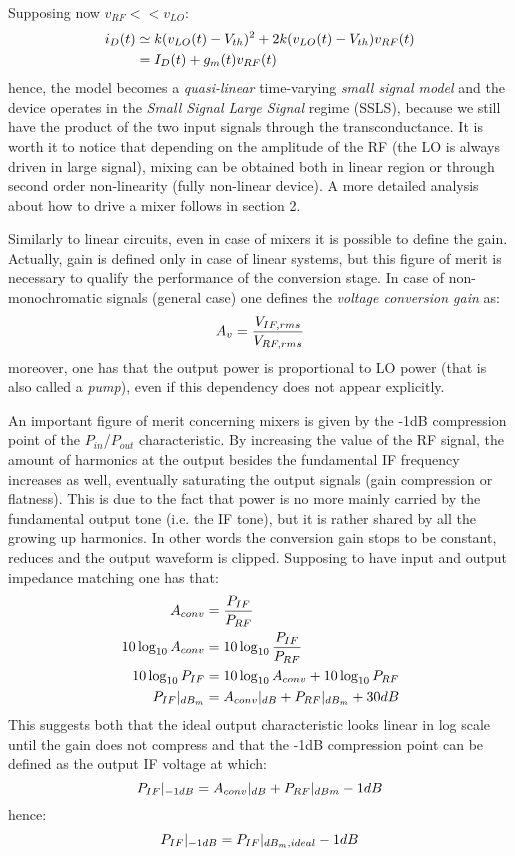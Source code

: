 Supposing now $v_{RF}<<v_{LO}$:
\begin{align}
i_D(t) &\simeq k(v_{LO}(t)-V_{th})^2+2k(v_{LO}(t)-V_{th})v_{RF}(t) \notag  \\
& = I_D(t)+g_m(t)v_{RF}(t) \notag
\end{align}
hence, the model becomes a \emph{quasi-linear} time-varying \emph{small signal model} and the device operates in the \emph{Small Signal Large Signal} regime (SSLS), because we still have the product of the two input signals through the transconductance. It is worth it to notice that depending on the amplitude of the RF (the LO is always driven in large signal), mixing can be obtained both in linear region or through second order non-linearity (fully non-linear device).
A more detailed analysis about how to drive a mixer follows in section 2.

Similarly to linear circuits, even in case of mixers it is possible to define the gain. Actually, gain is defined only in case of linear systems, but this figure of merit is necessary to qualify the performance of the conversion stage.
In case of non-monochromatic signals (general case) one defines the \emph{voltage conversion gain} as:
\begin{equation}
	A_v= \frac{V_{IF,rms}}{V_{RF,rms}} \notag
\end{equation}
moreover, one has that the output power is proportional to LO power (that is also called a \emph{pump}), even if this dependency does not appear explicitly.

An important figure of merit concerning mixers is given by the -1dB compression point of the $P_{in}$/$P_{out}$ characteristic. By increasing the value of the RF signal, the amount of harmonics at the output besides the fundamental IF frequency increases as well, eventually saturating the output signals (gain compression or flatness). This is due to the fact that power is no more mainly carried by the fundamental output tone (i.e. the IF tone), but it is rather shared by all the growing up harmonics. In other words the conversion gain stops to be constant, reduces and the output waveform is clipped. Supposing to have input and output impedance matching one has that:
\begin{align}
	A_{conv}&=\frac{P_{IF}}{P_{RF}} \notag \\
	10\log_{10}A_{conv} & = 10\log_{10}\frac{P_{IF}}{P_{RF}}  \notag \\
	10\log_{10}P_{IF} & = 10\log_{10}A_{conv} + 10\log_{10}P_{RF} \notag \\	P_{IF}|_{dB_{m}} &= A_{conv}|_{dB} + P_{RF}|_{dB_{m}}+30dB \notag
\end{align}
This suggests both that the ideal output characteristic looks linear in log scale until the gain does not compress and that the -1dB compression point can be defined as the output IF voltage at which:
\begin{equation}
P_{IF}|_{-1dB} = A_{conv}|_{dB} + P_{RF}|_{dBm} -1dB \notag
\end{equation}
hence:
\begin{equation}
P_{IF}|_{-1dB} = P_{IF}|_{dB_{m},ideal} -1dB \notag
\end{equation}

